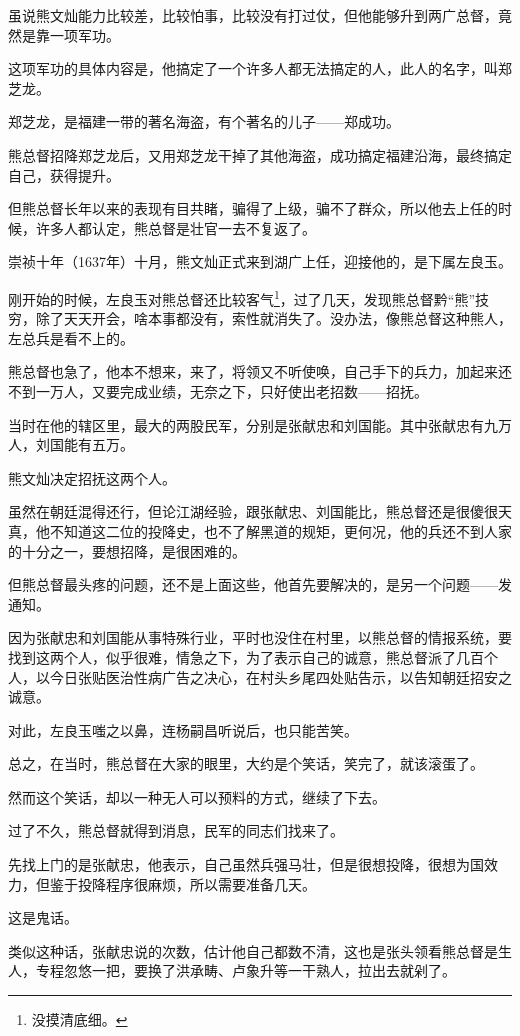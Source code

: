 \begin{multicols}{\theparacolNo}
虽说熊文灿能力比较差，比较怕事，比较没有打过仗，但他能够升到两广总督，竟然是靠一项军功。

这项军功的具体内容是，他搞定了一个许多人都无法搞定的人，此人的名字，叫郑芝龙。

郑芝龙，是福建一带的著名海盗，有个著名的儿子——郑成功。

熊总督招降郑芝龙后，又用郑芝龙干掉了其他海盗，成功搞定福建沿海，最终搞定自己，获得提升。

但熊总督长年以来的表现有目共睹，骗得了上级，骗不了群众，所以他去上任的时候，许多人都认定，熊总督是壮官一去不复返了。

崇祯十年（1637年）十月，熊文灿正式来到湖广上任，迎接他的，是下属左良玉。

刚开始的时候，左良玉对熊总督还比较客气\footnote{没摸清底细。}，过了几天，发现熊总督黔“熊”技穷，除了天天开会，啥本事都没有，索性就消失了。没办法，像熊总督这种熊人，左总兵是看不上的。

熊总督也急了，他本不想来，来了，将领又不听使唤，自己手下的兵力，加起来还不到一万人，又要完成业绩，无奈之下，只好使出老招数——招抚。

当时在他的辖区里，最大的两股民军，分别是张献忠和刘国能。其中张献忠有九万人，刘国能有五万。

熊文灿决定招抚这两个人。

虽然在朝廷混得还行，但论江湖经验，跟张献忠、刘国能比，熊总督还是很傻很天真，他不知道这二位的投降史，也不了解黑道的规矩，更何况，他的兵还不到人家的十分之一，要想招降，是很困难的。

但熊总督最头疼的问题，还不是上面这些，他首先要解决的，是另一个问题——发通知。

因为张献忠和刘国能从事特殊行业，平时也没住在村里，以熊总督的情报系统，要找到这两个人，似乎很难，情急之下，为了表示自己的诚意，熊总督派了几百个人，以今日张贴医治性病广告之决心，在村头乡尾四处贴告示，以告知朝廷招安之诚意。

对此，左良玉嗤之以鼻，连杨嗣昌听说后，也只能苦笑。

总之，在当时，熊总督在大家的眼里，大约是个笑话，笑完了，就该滚蛋了。

然而这个笑话，却以一种无人可以预料的方式，继续了下去。

过了不久，熊总督就得到消息，民军的同志们找来了。

先找上门的是张献忠，他表示，自己虽然兵强马壮，但是很想投降，很想为国效力，但鉴于投降程序很麻烦，所以需要准备几天。

这是鬼话。

类似这种话，张献忠说的次数，估计他自己都数不清，这也是张头领看熊总督是生人，专程忽悠一把，要换了洪承畴、卢象升等一干熟人，拉出去就剁了。


\end{multicols}
